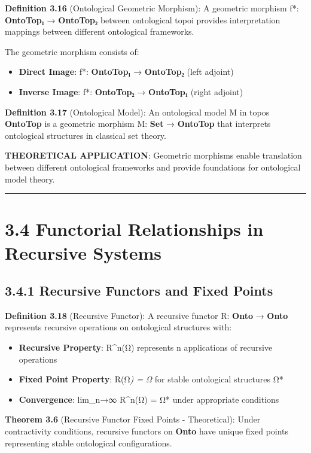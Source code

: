 \textbf{Definition 3.16} (Ontological Geometric Morphism): A geometric morphism f*: \textbf{OntoTop₁} → \textbf{OntoTop₂} between ontological topoi provides interpretation mappings between different ontological frameworks.

The geometric morphism consists of:
\begin{itemize}
\item \textbf{Direct Image}: f*: \textbf{OntoTop₁} → \textbf{OntoTop₂} (left adjoint)
\item \textbf{Inverse Image}: f*: \textbf{OntoTop₂} → \textbf{OntoTop₁} (right adjoint)
\end{itemize}

\textbf{Definition 3.17} (Ontological Model): An ontological model M in topos \textbf{OntoTop} is a geometric morphism M: \textbf{Set} → \textbf{OntoTop} that interprets ontological structures in classical set theory.

\textbf{THEORETICAL APPLICATION}: Geometric morphisms enable translation between different ontological frameworks and provide foundations for ontological model theory.

\hrule

\section{3.4 Functorial Relationships in Recursive Systems}

\subsection{3.4.1 Recursive Functors and Fixed Points}

\textbf{Definition 3.18} (Recursive Functor): A recursive functor R: \textbf{Onto} → \textbf{Onto} represents recursive operations on ontological structures with:

\begin{itemize}
\item \textbf{Recursive Property}: R^n(Ω) represents n applications of recursive operations
\item \textbf{Fixed Point Property}: R(Ω\textit{) = Ω} for stable ontological structures Ω*
\item \textbf{Convergence}: lim_{n→∞} R^n(Ω) = Ω* under appropriate conditions
\end{itemize}

\textbf{Theorem 3.6} (Recursive Functor Fixed Points - Theoretical): Under contractivity conditions, recursive functors on \textbf{Onto} have unique fixed points representing stable ontological configurations.

